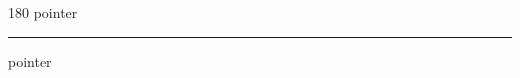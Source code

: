 
\begin{frame}
\begin{center}
\begin{turn}{180}
{\fontsize{2.5cm}{1em}\selectfont pointer}
\end{turn}
\vspace{1em}\par  
\hrule
\vspace{1em}\par  
{\fontsize{2.5cm}{1em}\selectfont pointer}
\end{center}
\end{frame}
